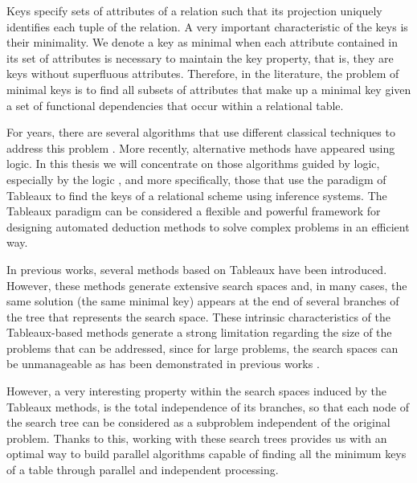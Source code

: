 Keys specify sets of attributes of a relation such that its projection uniquely identifies each tuple of the relation. A very important characteristic of the keys is their minimality. We denote a key as minimal when each attribute contained in its set of attributes is necessary to maintain the key property, that is, they are keys without superfluous attributes. Therefore, in the literature, the problem of minimal keys is to find all subsets of attributes that make up a minimal key given a set of functional dependencies that occur within a relational table.


For years, there are several algorithms that use different classical techniques to address this problem \cite{Lucchesi78, Yu76, Zhang09, Armstrong74}. More recently, alternative methods have appeared using logic. In this thesis we will concentrate on those algorithms guided by logic, especially by the logic \slfde \cite{Enciso2002}, and more specifically, those that use the paradigm of Tableaux \cite{Morgan1992, Risch1992} to find the keys of a relational scheme using inference systems. The Tableaux paradigm can be considered a flexible and powerful framework for designing automated deduction methods to solve complex problems in an efficient way.

In previous works, several methods based on Tableaux \cite{Wastl98a, Wastl98} have been introduced. However, these methods generate extensive search spaces and, in many cases, the same solution (the same minimal key) appears at the end of several branches of the tree that represents the search space. These intrinsic characteristics of the Tableaux-based methods generate a strong limitation regarding the size of the problems that can be addressed, since for large problems, the search spaces can be unmanageable as has been demonstrated in previous works \cite{Cordero2013}.

However, a very interesting property within the search spaces induced by the Tableaux methods, is the total independence of its branches, so that each node of the search tree can be considered as a subproblem independent of the original problem. Thanks to this, working with these search trees provides us with an optimal way to build parallel algorithms capable of finding all the minimum keys of a table through parallel and independent processing.


